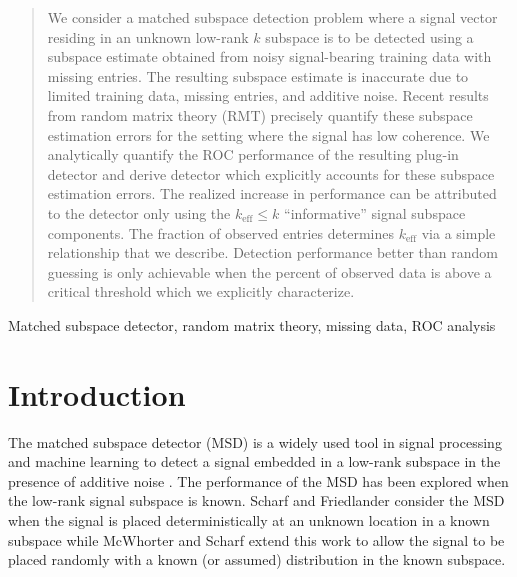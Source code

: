 \begin{abstract}
We consider a matched subspace detection problem where a signal vector residing in an unknown low-rank $k$ subspace is to be detected using a subspace estimate obtained from noisy signal-bearing training data with missing entries. The resulting subspace estimate is inaccurate due to limited training data, missing entries, and additive noise. Recent results from random matrix theory (RMT) precisely quantify these subspace estimation errors for the setting where the signal has low coherence. We analytically quantify the ROC performance of the resulting plug-in detector and derive \DIFdelbegin {}\DIFdelend \DIFaddbegin {}\DIFaddend detector which explicitly accounts for these subspace estimation errors. The realized increase in performance can be attributed to the \DIFdelbegin {}\DIFdelend \DIFaddbegin {}\DIFaddend detector only using the $k_\text{eff}\leq k$ ``informative'' signal subspace components. The fraction of observed entries determines $k_\text{eff}$ via a simple relationship that we describe. Detection performance better than random guessing is only achievable when the percent of observed data is above a critical threshold which we explicitly characterize.
\end{abstract}
%
\begin{keywords}
Matched subspace detector, random matrix theory, missing data, ROC analysis
\end{keywords}
%
\section{Introduction}\label{sec:intro}

The matched subspace detector (MSD) is a widely used tool in signal processing and machine learning to detect a signal embedded in a low-rank subspace in the presence of additive noise \cite{scharf1994matched,jin2005cfar,mcwhorter2003matched}. The performance of the MSD has been explored when the low-rank signal subspace is known. Scharf and Friedlander \cite{scharf1994matched} consider the MSD when the signal is placed deterministically at an unknown location in a known subspace while McWhorter and Scharf \cite{mcwhorter2003matched} extend this work to allow the signal to be placed randomly with a known (or assumed) distribution in the known subspace.


